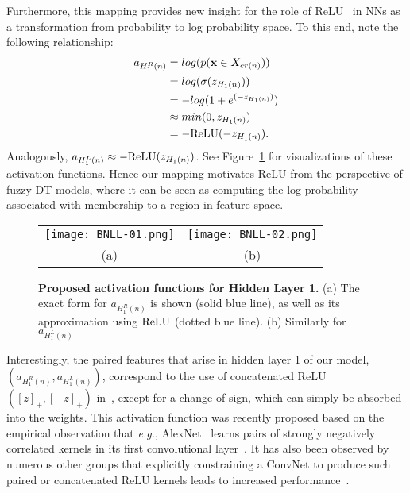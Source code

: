\documentclass[twocolumn]{svjour3}
\begin{document}
Furthermore, this mapping provides new insight for the role of ReLU~\cite{Nair:2010vq, Glorot:2011tm} in NNs as a transformation from probability to log probability space. To this end, note the following relationship: 
%
\begin{equation}
\begin{split}
	a_{H^R_1(n)} 
	& = log(p(\mathbf{x} \in X_{cr(n)})) \\
	& = log(\sigma(z_{H_1(n)})) \\
	& = - log(1+e^{(-z_{H_1(n)})}) \\
	& \approx min(0,z_{H_1(n)}) \\ 
	& = -\textnormal{ReLU}(-z_{H_1(n)}).
\end{split}
\end{equation}
Analogously, \mbox{$a_{H^L_1(n)} \approx -\textnormal{ReLU}(z_{H_1(n)})$}.
See Figure~\ref{fig:ReLU} for visualizations of these activation functions.
Hence our mapping motivates ReLU from the perspective of fuzzy DT models, where it can be seen as computing the log probability associated with membership to a region in feature space.


\begin{figure}[htp!]
\begin{center}
\begin{tabular}{cc}

   \texttt{[image: BNLL-01.png]} &
   \texttt{[image: BNLL-02.png]} \\
				   (a) & (b)
\end{tabular}
\end{center}
   \caption{\textbf{Proposed activation functions for Hidden Layer 1.} (a) The exact form for $a_{H^R_1(n)}$ is shown (solid blue line), as well as its approximation using $\textnormal{ReLU}$ (dotted blue line).  (b) Similarly for $a_{H^L_1(n)}$}
\label{fig:ReLU}
\end{figure}	


Interestingly, the paired features that arise in hidden layer 1 of our model, $(a_{H^R_1(n)},a_{H^L_1(n)})$, correspond to the use of concatenated ReLU $([z]_{+},\allowbreak[-z]_{+})$ in~\cite{Shang:2016tj}, except for a change of sign, which can simply be absorbed into the weights.
%
This activation function was recently proposed based on the empirical observation that \textit{e.g.}, AlexNet~\cite{krizhevsky_cnn_2012} learns pairs of strongly negatively correlated kernels in its first convolutional layer~\cite{Shang:2016tj}.  It has also been observed by numerous other groups that explicitly constraining a ConvNet to produce such paired or concatenated ReLU kernels leads to increased performance~\cite{Blot:2016ie, Coates:2011ud,Kim:2015us}.
\end{document}
